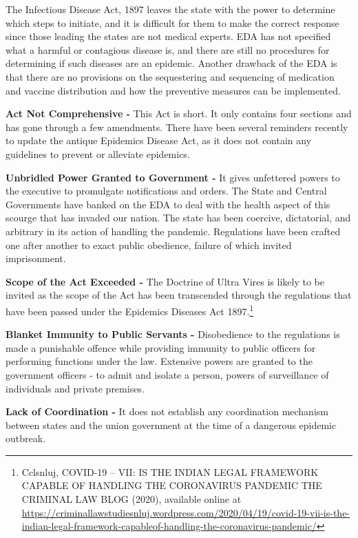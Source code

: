 \begin{multicols}{2}
\noi
The Infectious Disease Act, 1897 leaves the state with the power to determine which steps to
initiate, and it is difficult for them to make the correct response since those leading the states
are not medical experts. EDA has not specified what a harmful or contagious disease is, and
there are still no procedures for determining if such diseases are an epidemic. Another
drawback of the EDA is that there are no provisions on the sequestering and sequencing of
medication and vaccine distribution and how the preventive measures can be implemented.

\noi
\textbf{Act Not Comprehensive -} This Act is short. It only contains four sections and has gone
through a few amendments. There have been several reminders recently to update the antique
Epidemics Disease Act, as it does not contain any guidelines to prevent or alleviate
epidemics.

\noi
\textbf{Unbridled Power Granted to Government -} It gives unfettered powers to the executive to
promulgate notifications and orders. The State and Central Governments have banked on the
EDA to deal with the health aspect of this scourge that has invaded our nation. The state has
been coercive, dictatorial, and arbitrary in its action of handling the pandemic. Regulations
have been crafted one after another to exact public obedience, failure of which invited
imprisonment.

\noi
\textbf{Scope of the Act Exceeded -} The Doctrine of Ultra Vires is likely to be invited as the scope
of the Act has been transcended through the regulations that have been passed under the
Epidemics Diseases Act 1897.\footnote{Cclsnluj, COVID-19 – VII: IS THE INDIAN LEGAL FRAMEWORK CAPABLE OF HANDLING THE CORONAVIRUS PANDEMIC THE CRIMINAL LAW BLOG (2020), available online at \url{https://criminallawstudiesnluj.wordpress.com/2020/04/19/covid-19-vii-is-the-indian-legal-framework-capableof-handling-the-coronavirus-pandemic/}}

\noi
\textbf{Blanket Immunity to Public Servants -} Disobedience to the regulations is made a
punishable offence while providing immunity to public officers for performing functions
under the law. Extensive powers are granted to the government officers - to admit and isolate
a person, powers of surveillance of individuals and private premises.

\noi
\textbf{Lack of Coordination -} It does not establish any coordination mechanism between states and
the union government at the time of a dangerous epidemic outbreak.


\end{multicols}
